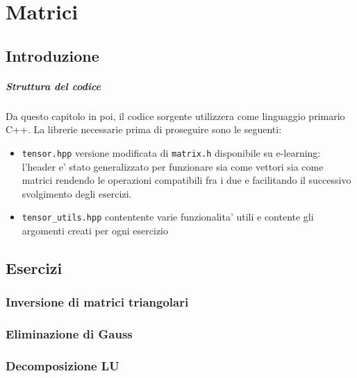 \setchapterpreamble[u]{\margintoc}
\chapter{Matrici}

\section{Introduzione}

\paragraph{Struttura del codice}

Da questo capitolo in poi, il codice sorgente utilizzera come linguaggio primario
C++. La librerie necessarie prima di proseguire sono le seguenti:

\begin{itemize}
    \item \texttt{tensor.hpp} versione modificata di \texttt{matrix.h} disponibile
        su e-learning: l'header e' stato generalizzato per funzionare sia come
        vettori sia come matrici rendendo le operazioni compatibili fra i due e 
        facilitando il successivo svolgimento degli esercizi.
    \item \texttt{tensor\_utils.hpp} contentente varie funzionalita' utili e contente
        gli argomenti creati per ogni esercizio
    
\end{itemize}

\section{Esercizi}

\subsection{Inversione di matrici triangolari}

\subsection{Eliminazione di Gauss}

\subsection{Decomposizione LU}

